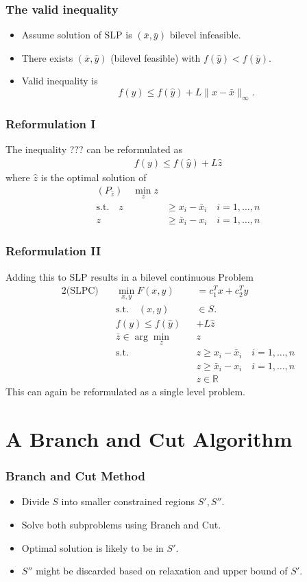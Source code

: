 \documentclass[11pt]{beamer}
\begin{document}
\begin{frame}
	\frametitle{The valid inequality}
	\begin{itemize}
		\item Assume solution of SLP is $(\bar x, \bar y)$ bilevel infeasible.
		\item There exists $(\bar x, \hat y)$ (bilevel feasible) with $f(\hat y) < f(\bar y)$.
		\item Valid inequality is 
		\begin{equation}
			f(y) \le f(\hat y) + L \|x-\bar x\|_{\infty}.
		\end{equation}
	\end{itemize}
\end{frame}
\begin{frame}
	\frametitle{Reformulation I}
	 The inequality ??? can be reformulated as 
		\begin{align*}
			f(y) \le f(\hat y) + L \hat z 
		\end{align*}
		where $\hat z$ is the optimal solution of 
		\begin{align*}
			(P_{\hat z}) \quad \min_{z} z \\
			\text{s.t.} \quad z &\ge x_i - \bar x_i \quad i = 1,\dots,n \\
			z &\ge \bar x_i - x_i \quad i = 1,\dots,n
		\end{align*}
\end{frame}

\begin{frame}
	\frametitle{Reformulation II}
	Adding this to SLP results in a bilevel continuous Problem 
\begin{alignat*}{2}
\text{(SLPC)} \quad &\min_{x,y} F(x,y)&& = c_1^Tx +c_2^Ty \\
&\text{s.t.} \quad (x,y)&& \in S. \\
&f(y) \le f(\hat y)&& + L \hat z \\
&\bar z \in \arg \min_{z}&& z \\
&  \text{s.t.} \quad &&z \ge x_i - \bar x_i \quad i = 1,\dots,n \\
& &&z \ge \bar x_i - x_i \quad i = 1,\dots,n \\
& && z \in \mathbb{R}
\end{alignat*}
This can again be reformulated as a single level problem.
\end{frame}

\section{A Branch and Cut Algorithm}
\begin{frame}
	\frametitle{Branch and Cut Method}
	\begin{itemize}
		\item Divide $S$ into smaller constrained regions $S', S''$.
		\item Solve both subproblems using Branch and Cut.
		\item Optimal solution is likely to be in $S'$. 
		\item $S''$ might be discarded based on relaxation and upper bound of $S'$.
	\end{itemize}
\end{frame}
\end{document}
